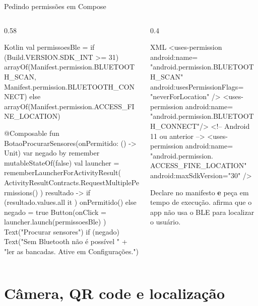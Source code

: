 \documentclass[aspectratio=169,10pt]{beamer}
\begin{document}
\begin{frame}[fragile]{Pedindo permissões em Compose}
  \begin{columns}[T]
    \begin{column}{0.58\textwidth}
\begin{codigo}[title=PermissaoBle.kt]{Kotlin}
val permissoesBle = if (Build.VERSION.SDK_INT >= 31)
  arrayOf(Manifest.permission.BLUETOOTH_SCAN,
          Manifest.permission.BLUETOOTH_CONNECT)
else arrayOf(Manifest.permission.ACCESS_FINE_LOCATION)

@Composable
fun BotaoProcurarSensores(onPermitido: () -> Unit) {
  var negado by remember { mutableStateOf(false) }
  val launcher = rememberLauncherForActivityResult(
    ActivityResultContracts.RequestMultiplePermissions()
  ) { resultado ->
    if (resultado.values.all { it }) onPermitido()
    else negado = true
  }
  Button(onClick = { launcher.launch(permissoesBle) }) {
    Text("Procurar sensores")
  }
  if (negado) Text("Sem Bluetooth não é possível " +
    "ler as bancadas. Ative em Configurações.")
}
\end{codigo}
    \end{column}
    \begin{column}{0.4\textwidth}
\begin{codigo}[title=AndroidManifest.xml]{XML}
<uses-permission android:name=
 "android.permission.BLUETOOTH_SCAN"
 android:usesPermissionFlags=
  "neverForLocation" />
<uses-permission android:name=
 "android.permission.BLUETOOTH_CONNECT"/>
<!-- Android 11 ou anterior -->
<uses-permission android:name=
 "android.permission.
   ACCESS_FINE_LOCATION"
 android:maxSdkVersion="30" />
\end{codigo}
      \begin{dica}
        Declare no manifesto \textbf{e} peça em tempo de execução.  afirma que o app não usa o BLE para localizar o usuário.
      \end{dica}
    \end{column}
  \end{columns}
\end{frame}

\section{Câmera, QR code e localização}
\end{document}
